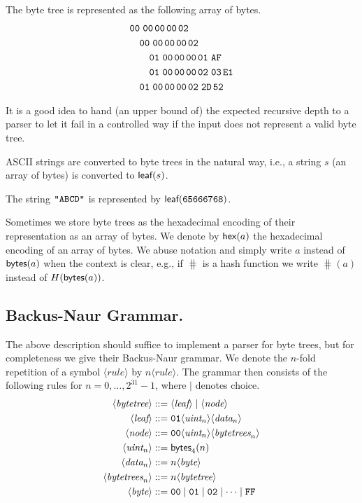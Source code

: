 \begin{example}
  The byte tree is represented as the following array of bytes.
  \begin{align*}
    &\hex{00\cutt00\cut00\cut00\cut02}\\
    &\quad\hex{00\cutt00\cut00\cut00\cut02}\\
    &\quad\quad\hex{01\cutt00\cut00\cut00\cut01\cutt AF}\\
    &\quad\quad\hex{01\cutt00\cut00\cut00\cut02\cutt03\cut E1}\\
    &\quad\hex{01\cutt00\cut00\cut00\cut02\cutt 2D\cut 52}
  \end{align*}
\end{example}


It is a good idea to hand (an upper bound of) the expected recursive
depth to a parser to let it fail in a controlled way if the input does
not represent a valid byte tree.

ASCII strings are converted to byte trees in the
natural way, i.e., a string $s$ (an array of bytes) is converted to
$\textsf{leaf}(s)$.
\begin{example}
  The string $\texttt{"ABCD"}$ is represented by $\textsf{leaf}(\texttt{65666768})$.
\end{example}
Sometimes we store byte trees as the hexadecimal encoding of their
representation as an array of bytes. We denote by $\textsf{hex}(a)$ the
hexadecimal encoding of an array of bytes. We abuse notation and
simply write $a$ instead of $\textsf{bytes}(a)$ when the context is clear,
e.g., if $\hash$ is a hash function we write $\hash(a)$ instead of
$H(\textsf{bytes}(a))$.

\subsection{Backus-Naur Grammar.}

The above description should suffice to implement a parser for byte
trees, but for completeness we give their Backus-Naur grammar. We
denote the $n$-fold repetition of a symbol
$\langle\textit{rule}\rangle$ by $n\langle\textit{rule}\rangle$. The
grammar then consists of the following rules for
$n=0,\ldots,2^{31}-1$, where $\mid$ denotes choice.
\begin{align*}
  \langle\textit{bytetree}\rangle&::=\langle\textit{leaf}\rangle\mid\langle\textit{node}\rangle\\
  \langle\textit{leaf}\rangle&::=\texttt{01}\langle\textit{uint}_n\rangle\langle\textit{data}_n\rangle\\
  \langle\textit{node}\rangle&::=\texttt{00}\langle\textit{uint}_n\rangle\langle\textit{bytetrees}_n\rangle\\
  \langle \textit{uint}_n\rangle&::=\textsf{bytes}_{4}(n)\\
  \langle \textit{data}_n\rangle&::=n\langle\textit{byte}\rangle\\
  \langle\textit{bytetrees}_n\rangle&::=n\langle\textit{bytetree}\rangle\\
  \langle \textit{byte}\rangle&::=\texttt{00}\mid \texttt{01}\mid
  \texttt{02}\mid\cdots\mid \texttt{FF}
\end{align*}
